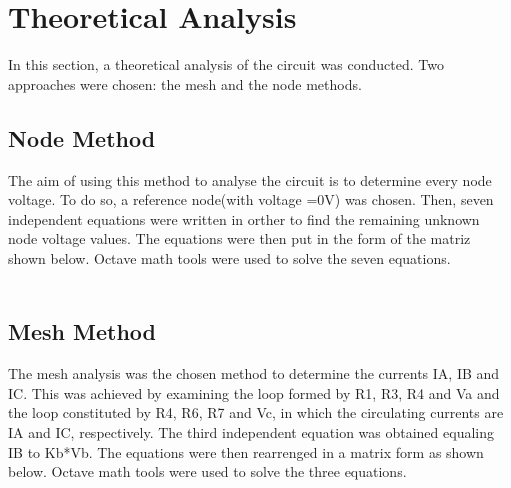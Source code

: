 

\section {Theoretical Analysis}
\label{analysis}

In this section, a theoretical analysis of the circuit was conducted. Two approaches were chosen: the mesh and the node methods.

\subsection{Node Method}

The aim of using this method to analyse the circuit is to determine every node voltage. To do so, a reference node(with voltage =0V) was chosen. Then, seven independent equations were written in orther to find the remaining unknown node voltage values. The equations were then put in the form of the matriz shown below. Octave math tools were used to solve the seven equations.\\
\


\subsection{Mesh Method}

The mesh analysis was the chosen method to determine the currents IA, IB and IC. This was achieved by examining the loop formed by R1, R3, R4 and Va and the loop constituted by R4, R6, R7 and Vc, in which the circulating currents are IA and IC, respectively. The third independent equation was obtained equaling IB to Kb*Vb. The equations were then rearrenged in a matrix form as shown below. Octave math tools were used to solve the three equations.
